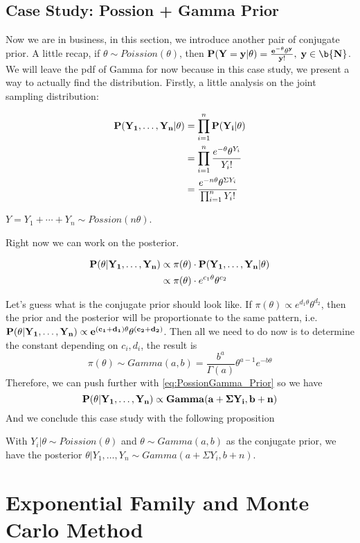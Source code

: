 \subsection{Case Study: Possion + Gamma Prior}
Now we are in business, in this section, we introduce another pair of conjugate prior. A little recap, if $\theta \sim Poission(\theta)$, then $\bf{P}(Y=y | \theta) = \frac{e^{-\theta}\theta^y}{y!}, \; y \in \b{N}$. We will leave the pdf of Gamma for now because in this case study, we present a way to actually find the distribution. Firstly, a little analysis on the joint sampling distribution:

\begin{align*}
    \bf{P}(Y_1, \ldots, Y_n | \theta)  &= \prod_{i=1}^{n}\bf{P}(Y_i | \theta) \\
    &= \prod_{i=1}^{n}\frac{e^{-\theta}\theta^{Y_i}}{Y_i!} \\
    &= \frac{e^{-n\theta}\theta^{\Sigma Y_i}}{\prod_{i=1}^{n} Y_i!}
\end{align*}

\begin{note}
    $Y = Y_1 + \cdots + Y_n \sim Possion(n\theta)$.
\end{note}

Right now we can work on the posterior.

\begin{align}
    \bf{P}(\theta | Y_1, \ldots, Y_n) &\propto \pi(\theta) \cdot \bf{P}(Y_1, \ldots, Y_n | \theta) \\
    &\propto \pi(\theta) \cdot e^{c_1\theta}\theta^{c_2} \label{eq:PossionGamma_Prior}
\end{align}

Let's guess what is the conjugate prior should look like. If $\pi(\theta) \propto e^{d_1\theta}\theta^{d_2}$, then the prior and the posterior will be proportionate to the same pattern, i.e. $\bf{P}(\theta | Y_1, \ldots, Y_n) \propto e^{(c_1 + d_1)\theta}\theta^{(c_2 + d_2)}$. Then all we need to do now is to determine the constant depending on $c_i, d_i$, the result is
\begin{equation*}
    \pi(\theta) \sim Gamma(a,b) = \frac{b^a}{\Gamma(a)}\theta^{a-1}e^{-b\theta}
\end{equation*}
Therefore, we can push further with \ref{eq:PossionGamma_Prior} so we have
\begin{equation*}
    \bf{P}(\theta | Y_1, \ldots, Y_n) \propto Gamma(a + \Sigma Y_i, b+n)
\end{equation*}
And we conclude this case study with the following proposition

\begin{proposition}\label{prop:PoissionGamma_Conjugate_Prior}
    With $Y_i|\theta \sim Poission(\theta)$ and $\theta \sim Gamma(a,b)$ as the conjugate prior, we have the posterior $\theta | Y_1, \ldots, Y_n \sim Gamma(a + \Sigma Y_i, b + n)$.
\end{proposition}


\section{Exponential Family and Monte Carlo Method}